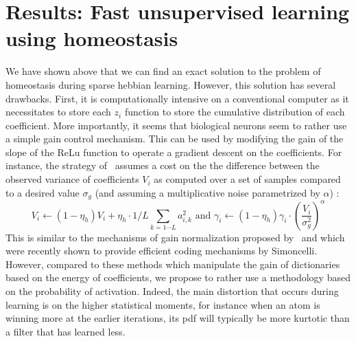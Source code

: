 \documentclass[a4paper, 11pt, draft]{article} %
\newcommand{\seeFig}[1]{Figure~\ref{fig:#1}}%
\begin{document}
\section{Results: Fast unsupervised learning using homeostasis}\label{results}
We have shown above that we can find an exact solution to the problem of homeostasis during sparse hebbian learning. However, this solution has several drawbacks. First, it is computationally intensive on a conventional computer as it necessitates to store each $z_i$ function to store the cumulative distribution of each coefficient. More importantly, it seems that biological neurons seem to rather use a simple gain control mechanism. This can be used by modifying the gain of the slope of the ReLu function to operate a gradient descent on the coefficients. For instance, the strategy of~\citep{Olshausen97} assumes a cost on the the difference between the observed variance of coefficients $V_i$ as computed over a set of samples compared to a desired value $\sigma_g$ (and assuming a multiplicative noise parametrized by $\alpha$) :
\begin{equation}%
V_i \leftarrow (1- \eta_h ) V_i + \eta_h \cdot 1/L\sum_{k=1\cdots L} a_{i, k}^2 \textrm{ and }
\gamma_i \leftarrow (1- \eta_h ) \gamma_i \cdot \left( \frac{V_i}{\sigma_g^2} \right)^\alpha
\end{equation}%
This is similar to the mechanisms of gain normalization proposed by~\citep{Schwartz01} and which were recently shown to provide efficient coding mechanisms by Simoncelli. However, compared to these methods which manipulate the gain of dictionaries based on the energy of coefficients, we propose to rather use a methodology based on the probability of activation. Indeed, the main distortion that occurs during learning is on the higher statistical moments, for instance when an atom is winning more at the earlier iterations, its pdf will typically be more kurtotic than a filter that has learned less.
\end{document}
